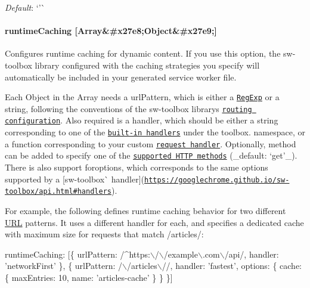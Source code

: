 {\itshape Default}\+: `'\textquotesingle{}\`{}

\paragraph*{runtime\+Caching \mbox{[}Array\&\#x27e8;Object\&\#x27e9;\mbox{]}}

Configures runtime caching for dynamic content. If you use this option, the {\ttfamily sw-\/toolbox} library configured with the caching strategies you specify will automatically be included in your generated service worker file.

Each {\ttfamily Object} in the {\ttfamily Array} needs a {\ttfamily url\+Pattern}, which is either a \href{https://developer.mozilla.org/en-US/docs/Web/JavaScript/Reference/Global_Objects/RegExp}{\tt {\ttfamily Reg\+Exp}} or a string, following the conventions of the {\ttfamily sw-\/toolbox} library\textquotesingle{}s \href{https://googlechrome.github.io/sw-toolbox/api.html#main}{\tt routing configuration}. Also required is a {\ttfamily handler}, which should be either a string corresponding to one of the \href{https://googlechrome.github.io/sw-toolbox/api.html#handlers}{\tt built-\/in handlers} under the {\ttfamily toolbox.} namespace, or a function corresponding to your custom \href{https://googlechrome.github.io/sw-toolbox/api.html#handlers}{\tt request handler}. Optionally, {\ttfamily method} can be added to specify one of the \href{https://googlechrome.github.io/sw-toolbox/api.html#expressive-approach}{\tt supported H\+T\+TP methods} (\+\_\+default\+: `\textquotesingle{}get'{\ttfamily \+\_\+). There is also support for}options{\ttfamily , which corresponds to the same options supported by a \mbox{[}}sw-\/toolbox\`{} handler\mbox{]}(\href{https://googlechrome.github.io/sw-toolbox/api.html#handlers}{\tt https\+://googlechrome.\+github.\+io/sw-\/toolbox/api.\+html\#handlers}).

For example, the following defines runtime caching behavior for two different \mbox{\hyperlink{namespace_u_r_l}{U\+RL}} patterns. It uses a different handler for each, and specifies a dedicated cache with maximum size for requests that match {\ttfamily /articles/}\+:


\begin{DoxyCode}
runtimeCaching: [\{
  urlPattern: /^https:\(\backslash\)/\(\backslash\)/example\(\backslash\).com\(\backslash\)/api/,
  handler: 'networkFirst'
\}, \{
  urlPattern: /\(\backslash\)/articles\(\backslash\)//,
  handler: 'fastest',
  options: \{
    cache: \{
      maxEntries: 10,
      name: 'articles-cache'
    \}
  \}
\}]
\end{DoxyCode}


